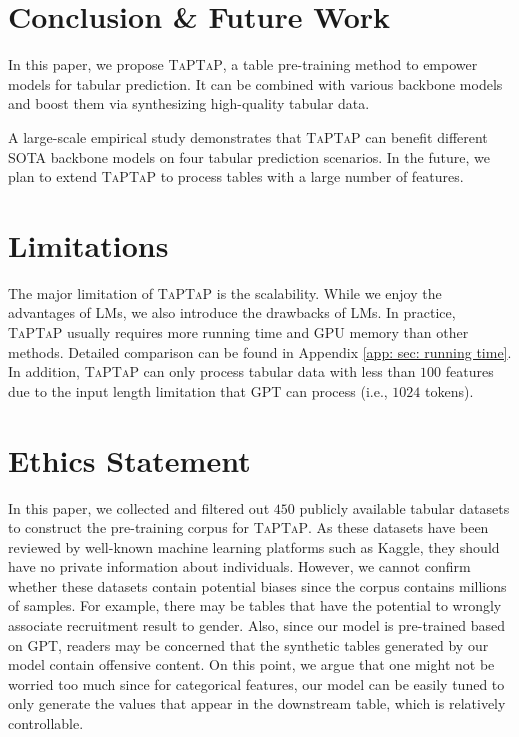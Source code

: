 \section{Conclusion \& Future Work} In this paper, we propose \textsc{TaPTaP}, a table pre-training method to empower models for tabular prediction. It can be combined with various backbone models and boost them via synthesizing high-quality tabular data.

A large-scale empirical study demonstrates that \textsc{TaPTaP} can benefit different SOTA backbone models on four tabular prediction scenarios. In the future, we plan to extend \textsc{TaPTaP} to process tables with a large number of features.

\section*{Limitations}
The major limitation of \textsc{TaPTaP} is the scalability. While we enjoy the advantages of LMs, we also introduce the drawbacks of LMs. In practice, \textsc{TaPTaP} usually requires more running time and GPU memory than other methods. Detailed comparison can be found in Appendix \ref{app: sec: running time}. In addition, \textsc{TaPTaP} can only process tabular data with less than $100$ features due to the input length limitation that GPT can process (i.e., $1024$ tokens).

\section*{Ethics Statement}

In this paper, we collected and filtered out $450$ publicly available tabular datasets to construct the pre-training corpus for \textsc{TaPTaP}.
As these datasets have been reviewed by well-known machine learning platforms such as Kaggle, they should have no private information about individuals. However, we cannot confirm whether these datasets contain potential biases since the corpus contains millions of samples. For example, there may be tables that have the potential to wrongly associate recruitment result to gender. Also, since our model is pre-trained based on GPT, readers may be concerned that the synthetic tables generated by our model contain offensive content. On this point, we argue that one might not be worried too much since for categorical features, our model can be easily tuned to only generate the values that appear in the downstream table, which is relatively controllable.


